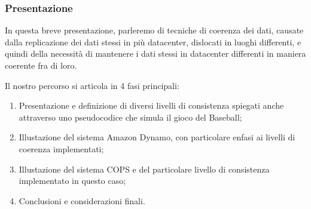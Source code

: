 \begin{frame}
\frametitle{Presentazione}
In questa breve presentazione, parleremo di tecniche di coerenza dei dati,
causate dalla replicazione dei dati stessi in più datacenter, dislocati in luoghi differenti,
e quindi della necessità di mantenere i dati stessi in datacenter differenti 
in maniera coerente fra di loro.

Il nostro percorso si articola in 4 fasi principali:
\begin{enumerate}
	\item Presentazione e definizione di diversi livelli di consistenza
		  spiegati anche attraverso uno pseudocodice che simula il gioco del Baseball;
	\item Illustazione del sistema Amazon Dynamo, con particolare enfasi ai
		  livelli di coerenza implementati;
	\item Illustazione del sistema COPS e del particolare livello di consistenza
		  implementato in questo caso;
	\item Conclusioni e considerazioni finali.
\end{enumerate}
\end{frame}
